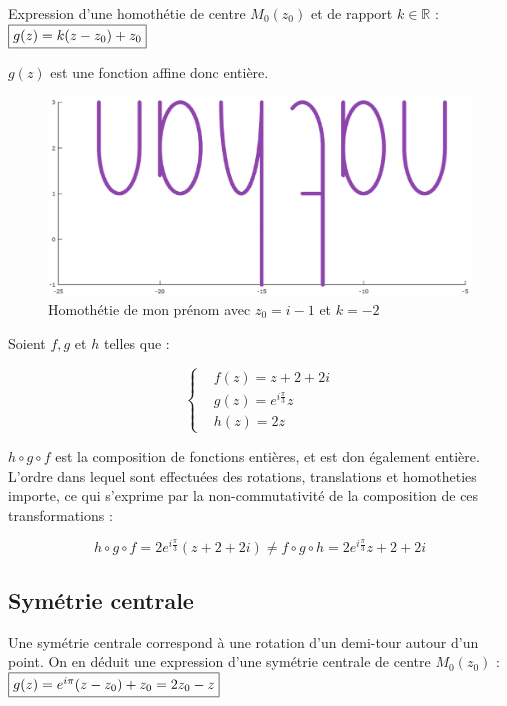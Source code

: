 \documentclass{article}
\begin{document}
      Expression d'une homothétie de centre $M_{0}(z_{0})$ et de rapport $k \in \mathbb{R}$ : 
      $\fbox{$g(z) = k(z - z_{0}) + z_{0}$}$

      $g(z)$ est une fonction affine donc entière.

      \begin{figure}[ht!]
        \centering
        \includegraphics[height=0.32\textwidth]{figures/homothetie.png}
        \caption{Homothétie de mon prénom avec $z_{0} = i - 1$ et $k = -2$}
      \end{figure}

      Soient $f, g$ et $h$ telles que :

      \begin{equation*}
        \left \{
        \begin{aligned}
          &f(z) = z + 2 + 2i \\
          &g(z) = e^{i\frac{\pi}{3}}z \\
          &h(z) = 2z
        \end{aligned} \right.
    \end{equation*} 

    $h \circ g \circ f$ est la composition de fonctions entières, et est don également entière. \\

    L'ordre dans lequel sont effectuées des rotations, translations et homotheties importe, ce qui s'exprime par la non-commutativité 
    de la composition de ces transformations :

    $$h \circ g \circ f = 2e^{i\frac{\pi}{3}}(z + 2 + 2i) \neq f \circ g \circ h = 2e^{i\frac{\pi}{3}}z + 2 + 2i$$

    \subsection{Symétrie centrale}

    Une symétrie centrale correspond à une rotation d'un demi-tour autour d'un point.
    On en déduit une expression d'une symétrie centrale de centre $M_{0}(z_{0})$ : 
    $\fbox{$g(z) = e^{i\pi}(z - z_{0}) + z_{0} = 2z_{0} - z$}$
\end{document}
